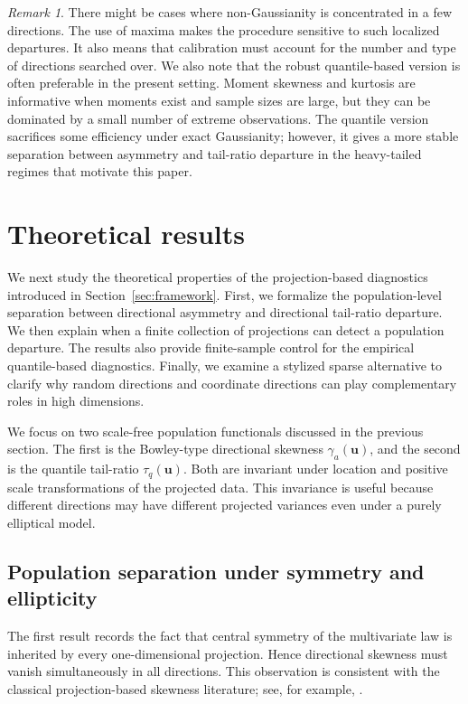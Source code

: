 \documentclass[11pt]{article}
\theoremstyle{plain}
\theoremstyle{definition}
\theoremstyle{remark}
\newtheorem{remark}{Remark}
\def\u{\bm{u}}
\begin{document}
\begin{remark}
	There might be cases where non-Gaussianity is concentrated in a few directions. The use of maxima makes the procedure sensitive to such localized departures. It also means that calibration must account for the number and type of directions searched over. We also note that the robust quantile-based version is often preferable in the present setting. Moment skewness and kurtosis are informative when moments exist and sample sizes are large, but they can be dominated by a small number of extreme observations. The quantile version sacrifices some efficiency under exact Gaussianity; however, it gives a more stable separation between asymmetry and tail-ratio departure in the heavy-tailed regimes that motivate this paper.
\end{remark}


\section{Theoretical results}
\label{sec:theory}

We next study the theoretical properties of the projection-based diagnostics introduced in Section~\ref{sec:framework}. First, we formalize the population-level separation between directional asymmetry and directional tail-ratio departure. We then explain when a finite collection of projections can detect a population departure. The results also provide finite-sample control for the empirical quantile-based diagnostics. Finally, we examine a stylized sparse alternative to clarify why random directions and coordinate directions can play complementary roles in high dimensions.

We focus on two scale-free population functionals discussed in the previous section. The first is the Bowley-type directional skewness \(\gamma_a(\u)\), and the second is the quantile tail-ratio \(\tau_q(\u)\). Both are invariant under location and positive scale transformations of the projected data. This invariance is useful because different directions may have different projected variances even under a purely elliptical model. 

\subsection{Population separation under symmetry and ellipticity}
\label{subsec:population-separation}

The first result records the fact that central symmetry of the multivariate law is inherited by every one-dimensional projection. Hence directional skewness must vanish simultaneously in all directions. This observation is consistent with the classical projection-based skewness literature; see, for example, \citet{malkovich1973tests,baringhaus1991limit}.
\end{document}
